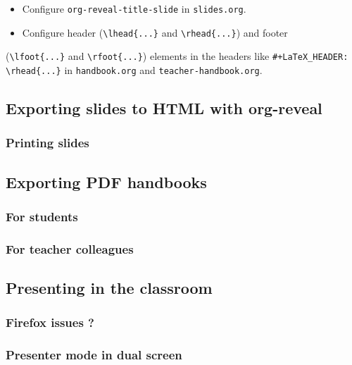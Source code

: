\documentclass[a4paper]{article}
\begin{document}
\begin{itemize}
\item Configure \texttt{org-reveal-title-slide} in \texttt{slides.org}.

\item Configure header (\texttt{\textbackslash{}lhead\{...\}} and \texttt{\textbackslash{}rhead\{...\}}) and footer
\end{itemize}
(\texttt{\textbackslash{}lfoot\{...\}} and \texttt{\textbackslash{}rfoot\{...\}}) elements in the headers like \texttt{\#+LaTeX\_HEADER: \textbackslash{}rhead\{...\}}
in \texttt{handbook.org} and \texttt{teacher-handbook.org}.

\subsection{Exporting slides to HTML with org-reveal}
\label{sec:org1b36846}

\subsubsection{Printing slides}
\label{sec:org6874337}

\subsection{Exporting PDF handbooks}
\label{sec:orgbf0728a}

\subsubsection{For students}
\label{sec:org1ea4f37}

\subsubsection{For teacher colleagues}
\label{sec:org41b2e9d}

\subsection{Presenting in the classroom}
\label{sec:orgd0de969}

\subsubsection{Firefox issues ?}
\label{sec:org2dc09fb}

\subsubsection{Presenter mode in dual screen}
\label{sec:org501d3dc}
\end{document}
